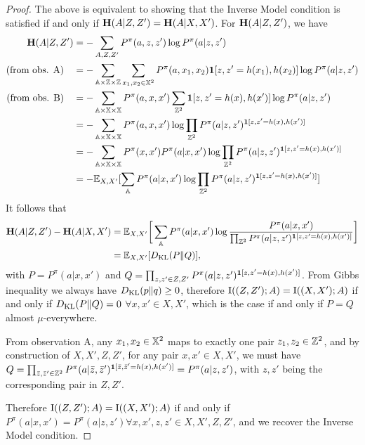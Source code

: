 \begin{proof}
The above is equivalent to showing that the Inverse Model condition is satisfied if and only if $\mathbf{H} (A|Z,Z') = \mathbf{H} (A|X,X')$. For $\mathbf{H} (A|Z,Z')$, we have
\begin{align*}
    \mathbf{H} (A|Z,Z') &= -\sum_{A  ,  Z  ,  Z'} P^\pi(a,z,z') \log P^\pi(a|z,z') \\
    \text{(from obs. A)} \quad    &= -\sum_{{\mathbb{A}} \times{\mathbb{Z}}\times{\mathbb{Z}}} \sum_{x_1,x_2\in {\mathbb{X}}^2} P^\pi(a,x_1,x_2) \bm{1}[z,z'=h(x_1),h(x_2)]  \log P^\pi(a|z,z')\\
   \text{(from obs. B)} \quad & = -\sum_{{\mathbb{A}} \times{\mathbb{X}}\times{\mathbb{X}}} P^\pi (a,x,x')\sum_{{\mathbb{Z}}^2}\bm{1}[z,z'=h(x),h(x')]\log P^\pi (a|z,z') \\
    & = - \sum_{{\mathbb{A}} \times{\mathbb{X}}\times{\mathbb{X}}} P^\pi (a,x,x') \log \prod_{{\mathbb{Z}}^2} P^\pi (a|z,z')^{\bm{1}[z,z'=h(x),h(x')]}\\
    & = - \sum_{{\mathbb{A}} \times{\mathbb{X}}\times{\mathbb{X}}} P^\pi (x,x')P^\pi (a|x,x') \log \prod_{{\mathbb{Z}}^2} P^\pi (a|z,z')^{\bm{1}[z,z'=h(x),h(x')]}\\
    & = - \mathbb{E}_{X  ,  X'} [\sum_{\mathbb{A}} P^\pi (a|x,x') \log \prod_{{\mathbb{Z}}^2} P^\pi (a|z,z')^{\bm{1}[z,z'=h(x),h(x')]}]
\end{align*}
It follows that 
\begin{align*}
    \mathbf{H} (A|Z,Z') - \mathbf{H} (A|X,X') &=\mathbb{E}_{X  ,  X'}\bigg[\sum_{\mathbb{A}} P^\pi (a|x,x') \log \frac{P^\pi (a|x,x')}{\prod_{{\mathbb{Z}}^2} P^\pi (a|z,z')^{\bm{1}[z,z'=h(x),h(x')]}}\bigg] \\
    & = \mathbb{E}_{X,X'}[ D_{\mathrm{KL}} (P \Vert Q)],
\end{align*}
with $P=P^\pi (a|x,x')$ and $Q=\prod_{z,z'\in  Z,Z'} P^\pi (a|z,z')^{\bm{1}[z,z'=h(x),h(x')]}$. From Gibbs inequality we always have $D_{\mathrm{KL}} (p \Vert q) \geq 0$, therefore $\text{I}((Z,Z');A)=\text{I}((X,X');A)$ if and only if $D_{\mathrm{KL}} (P \Vert Q) = 0$  $\forall x,x' \in X,X'$, which is the case if and only if $P=Q$ almost $\mu$-everywhere.

From observation A, any $x_1,x_2\in {\mathbb{X}}^2$  maps to exactly one pair $z_1,z_2\in{\mathbb{Z}}^2$, and by construction of $X,X',Z,Z'$, for any pair $x,x'\in X,X'$, we must have $Q=\prod_{\bar{z},\bar{z}'\in  {\mathbb{Z}}^2}P^\pi(a|\bar{z},\bar{z}')^{\bm{1}[\bar{z},\bar{z}'=h(x),h(x')]}=P^\pi (a|z,z')$, with $z,z'$ being the corresponding pair in $Z,Z'$.

Therefore $\text{I}((Z,Z');A)=\text{I}((X,X');A)$ if and only if $P^\pi (a|x,x')=P^\pi (a|z,z') \forall x,x',z,z'\in X,X',Z,Z'$, and we recover the Inverse Model condition.


\end{proof}
